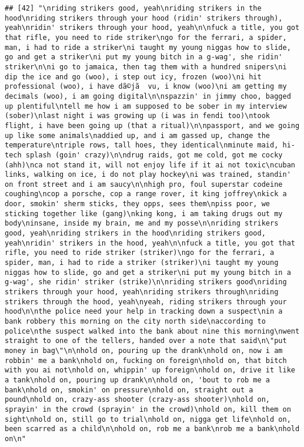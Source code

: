 \documentclass[]{article}
\begin{document}
\begin{verbatim}
## [42] "\nriding strikers good, yeah\nriding strikers in the hood\nriding strikers through your hood (ridin' strikers through), yeah\nridin' strikers through your hood, yeah\n\nfuck a title, you got that rifle, you need to ride striker\ngo for the ferrari, a spider, man, i had to ride a striker\ni taught my young niggas how to slide, go and get a striker\ni put my young bitch in a g-wag', she ridin' striker\n\ni go to jamaica, then tag them with a hundred snipers\ni dip the ice and go (woo), i step out icy, frozen (woo)\ni hit professional (woo), i have dã©jã  vu, i know (woo)\ni am getting my decimals (woo), i am going digital\n\nspazzin' in jimmy choo, bagged up plentiful\ntell me how i am supposed to be sober in my interview (sober)\nlast night i was growing up (i was in fendi too)\ntook flight, i have been going up (that a ritual)\n\npassport, and we going up like some animals\naddied up, and i am gassed up, change the temperature\ntriple rows, tall hoes, they identical\nminute maid, hi-tech splash (goin' crazy)\n\ndrug raids, got me cold, got me cocky (ahh)\nca not stand it, will not enjoy life if it ai not toxic\ncuban links, walking on ice, i do not play hockey\ni was trained, standin' on front street and i am saucy\n\nhigh pro, foul superstar codeine coughing\ncop a porsche, cop a range rover, it king joffrey\nkick a door, smokin' sherm sticks, they opps, sees them\npiss poor, we sticking together like (gang)\nking kong, i am taking drugs out my body\ninsane, inside my brain, me and my posse\n\nriding strikers good, yeah\nriding strikers in the hood\nriding strikers good, yeah\nridin' strikers in the hood, yeah\n\nfuck a title, you got that rifle, you need to ride striker (striker)\ngo for the ferrari, a spider, man, i had to ride a striker (striker)\ni taught my young niggas how to slide, go and get a striker\ni put my young bitch in a g-wag', she ridin' striker (strike)\n\nriding strikers good\nriding strikers through your hood, yeah\nriding strikers through\nriding strikers through the hood, yeah\nyeah, riding strikers through your hood\n\nthe police need your help in tracking down a suspect\nin a bank robbery this morning on the city north side\naccording to police\nthe suspect walked into the bank about nine this morning\nwent straight to one of the tellers, handed over a note that said\n\"put money in bag\"\n\nhold on, pouring up the drank\nhold on, now i am robbin' me a bank\nhold on, fucking on foreign\nhold on, that bitch with you ai not\nhold on, whippin' up foreign\nhold on, drive it like a tank\nhold on, pouring up drank\n\nhold on, 'bout to rob me a bank\nhold on, smokin' on pressure\nhold on, straight out a pound\nhold on, crazy-ass shooter (crazy-ass shooter)\nhold on, sprayin' in the crowd (sprayin' in the crowd)\nhold on, kill them on sight\nhold on, still go to trial\nhold on, nigga get life\nhold on, been scarred as a child\n\nhold on, rob me a bank\nrob me a bank\nhold on\n"                                                                                                                                                                                                                                                                                                                                                                           
\end{verbatim}
\end{document}
